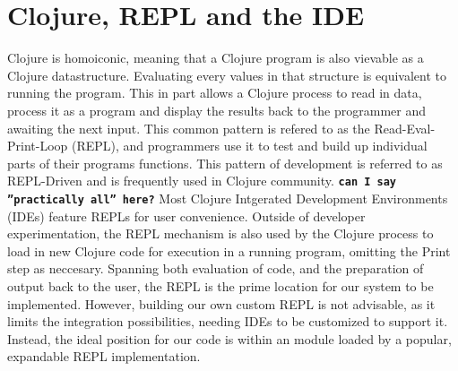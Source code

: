 \documentclass[12pt]{article}
\newcommand{\comment}[1]{{\bf \tt  {#1}}}
\newcommand{\emcomment}[1]{\textcolor{ForestGreen}{\comment{Elena: {#1}}}}
\begin{document}


\section{Clojure, REPL and the IDE}
Clojure is homoiconic, meaning that a Clojure program is also
vievable as a Clojure datastructure. Evaluating every values in that structure is
equivalent to running the program.
This in part allows a Clojure process to read in data, process it as a program
and display the results back to the programmer and awaiting the next input.
 This common pattern is refered to
as the Read-Eval-Print-Loop (REPL), and programmers use it to test and build up
individual parts of their programs functions. This pattern of development is
referred to as REPL-Driven and is frequently used in Clojure community.
\comment{can I say ''practically all'' here?}
 Most Clojure Intgerated Development Environments (IDEs) feature REPLs for
 user convenience. Outside of developer experimentation, the REPL mechanism is also used
by the Clojure process to load in new Clojure code for execution in a running program,
omitting the Print step as neccesary.
Spanning both evaluation of code, and the preparation of output back to the user,
the REPL is the prime location for our system to be implemented.
However, building our own custom REPL is not advisable, as it limits the
integration possibilities, needing IDEs to be customized to support it.
Instead, the ideal position for our code is within an module loaded
by a popular, expandable REPL implementation.
\end{document}
